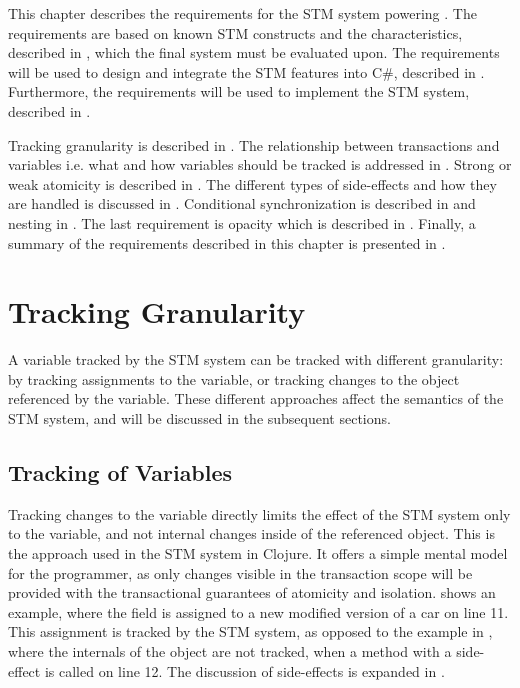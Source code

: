 \makeatletter {}\makeatother
{}
This chapter describes the requirements for the \ac{STM} system powering \stmname. The requirements are based on known \ac{STM} constructs and the characteristics, described in , which the final system must be evaluated upon. The requirements will be used to design and integrate the \ac{STM} features into C\#, described in . Furthermore, the requirements will be used to implement the \ac{STM} system, described in .

Tracking granularity is described in . The relationship between transactions and variables i.e. what and how variables should be tracked is addressed in . Strong or weak atomicity is described in . The different types of side-effects and how they are handled is discussed in . Conditional synchronization is described in  and nesting in . The last requirement is opacity which is described in . Finally, a summary of the requirements described in this chapter is presented in .
\label{sec:stm_requirements}

\section{Tracking Granularity}\label{sec:tracking}
A variable tracked by the \ac{STM} system can be tracked with different granularity: by tracking assignments to the variable, or tracking changes to the object referenced by the variable. These different approaches affect the semantics of the \ac{STM} system, and will be discussed in the subsequent sections.

\subsection{Tracking of Variables} 
Tracking changes to the variable directly limits the effect of the \ac{STM} system only to the variable, and not internal changes inside of the referenced object. This is the approach used in the \ac{STM} system in Clojure\cite{clojureConcurrent}. It offers a simple mental model for the programmer, as only changes visible in the transaction scope will be provided with the transactional guarantees of atomicity and isolation.   shows an example, where the field  is assigned to a new modified version of a car on line 11. This assignment is tracked by the \ac{STM} system, as opposed to the example in , where the internals of the object are not tracked, when a method with a side-effect is called on line 12. The discussion of side-effects is expanded in .

